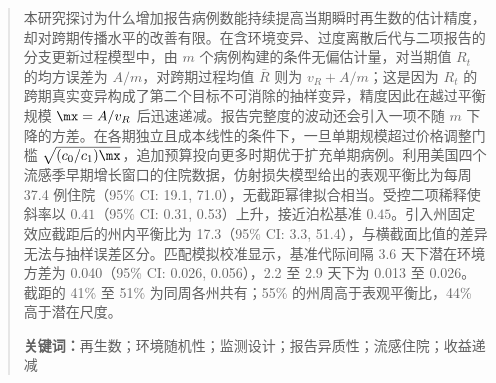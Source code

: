\begin{abstract}
\noindent 本研究探讨为什么增加报告病例数能持续提高当期瞬时再生数的估计精度，却对跨期传播水平的改善有限。在含环境变异、过度离散后代与二项报告的分支更新过程模型中，由 $m$ 个病例构建的条件无偏估计量，对当期值 $R_t$ 的均方误差为 $A/m$，对跨期过程均值 $\bar{R}$ 则为 $v_R+A/m$；这是因为 $R_t$ 的跨期真实变异构成了第二个目标不可消除的抽样变异，精度因此在越过平衡规模 $\mx=A/v_R$ 后迅速递减。报告完整度的波动还会引入一项不随 $m$ 下降的方差。在各期独立且成本线性的条件下，一旦单期规模超过价格调整门槛 $\sqrt{(c_0/c_1)\mx}$，追加预算投向更多时期优于扩充单期病例。利用美国四个流感季早期增长窗口的住院数据，仿射损失模型给出的表观平衡比为每周 37.4 例住院（95\% CI: 19.1, 71.0），无截距幂律拟合相当。受控二项稀释使斜率以 $0.41$（95\% CI: 0.31, 0.53）上升，接近泊松基准 $0.45$。引入州固定效应截距后的州内平衡比为 17.3（95\% CI: 3.3, 51.4），与横截面比值的差异无法与抽样误差区分。匹配模拟校准显示，基准代际间隔 3.6 天下潜在环境方差为 0.040（95\% CI: 0.026, 0.056），2.2 至 2.9 天下为 0.013 至 0.026。截距的 41\% 至 51\% 为同周各州共有；55\% 的州周高于表观平衡比，44\% 高于潜在尺度。

\medskip
\noindent\textbf{关键词：}再生数；环境随机性；监测设计；报告异质性；流感住院；收益递减
\end{abstract}
